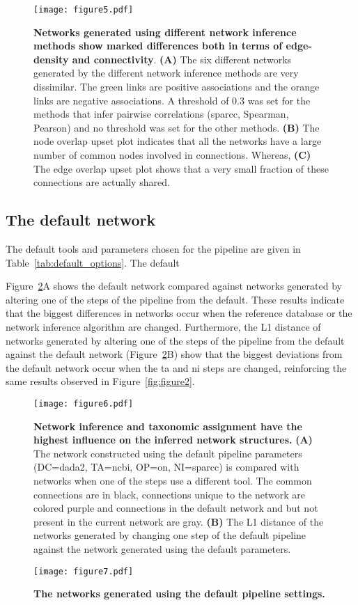   \begin{figure}[h]
    \centering
    \texttt{[image: figure5.pdf]}
    \caption{
      \textbf{Networks generated using different network inference methods show marked differences both in terms of edge-density and connectivity}.
      \textbf{(A)} The six different networks generated by the different network inference methods are very dissimilar.
      The green links are positive associations and the orange links are negative associations.
      A threshold of 0.3 was set for the methods that infer pairwise correlations (\ac{sparcc}, Spearman, Pearson) and no threshold was set for the other methods.
      \textbf{(B)} The node overlap upset plot indicates that all the networks have a large number of common nodes involved in connections.
      Whereas, \textbf{(C)} The edge overlap upset plot shows that a very small fraction of these connections are actually shared.
    }
    \label{fig:figure5}
  \end{figure}

  \FloatBarrier

  \subsection*{The default network}

  The default tools and parameters chosen for the pipeline are given in Table~\ref{tab:default_options}.
  The default

  Figure~\ref{fig:figure6}A shows the default network compared against networks generated by altering one of the steps of the pipeline from the default.
  These results indicate that the biggest differences in networks occur when the reference database or the network inference algorithm are changed.
  Furthermore, the L1 distance of networks generated by altering one of the steps of the pipeline from the default against the default network (Figure~\ref{fig:figure6}B) show that the biggest deviations from the default network occur when the \ac{ta} and \ac{ni} steps are changed, reinforcing the same results observed in Figure~\ref{fig:figure2}.

  \begin{figure}[h]
    \centering
    \texttt{[image: figure6.pdf]}
    \caption{
      \textbf{Network inference and taxonomic assignment have the highest influence on the inferred network structures.}
      \textbf{(A)} The network constructed using the default pipeline parameters (DC=\ac{dada2}, TA=\ac{ncbi}, OP=on, NI=\ac{sparcc}) is compared with networks when one of the steps use a different tool.
      The common connections are in black, connections unique to the network are colored purple and connections in the default network and but not present in the current network are gray.
      \textbf{(B)} The L1 distance of the networks generated by changing one step of the default pipeline against the network generated using the default parameters.
    }
    \label{fig:figure6}
  \end{figure}


  \begin{figure}[h]
    \centering
    \texttt{[image: figure7.pdf]}
    \caption{
      \textbf{The networks generated using the default pipeline settings.}
  }
    \label{fig:figure7}
  \end{figure}
